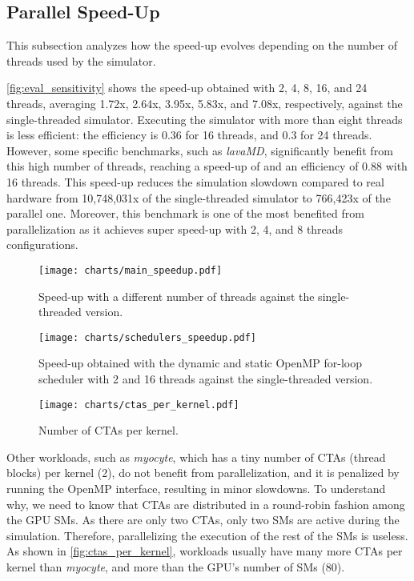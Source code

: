 \subsection{Parallel Speed-Up}

\par
This subsection analyzes how the speed-up evolves depending on the number of threads used by the simulator. 

\par
\autoref{fig:eval_sensitivity} shows the speed-up obtained with 2, 4, 8, 16, and 24 threads, averaging 1.72x, 2.64x, 3.95x, 5.83x, and 7.08x, respectively, against the single-threaded simulator. Executing the simulator with more than eight threads is less efficient: the efficiency is 0.36 for 16 threads, and 0.3 for 24 threads. However, some specific benchmarks, such as \textit{lavaMD}, significantly benefit from this high number of threads, reaching a speed-up of \summaryMaxSpeedup{} and an efficiency of 0.88 with 16 threads. This speed-up reduces the simulation slowdown compared to real hardware from 10,748,031x of the single-threaded simulator to 766,423x of the parallel one. Moreover, this benchmark is one of the most benefited from parallelization as it achieves super speed-up with 2, 4, and 8 threads configurations.


\begin{figure*}[ht]
  \centering
  \texttt{[image: charts/main\_speedup.pdf]}
  \caption{Speed-up with a different number of threads against the single-threaded version.}
  \label{fig:eval_sensitivity}
\end{figure*}

\begin{figure*}[ht]
  \centering
  \texttt{[image: charts/schedulers\_speedup.pdf]}
  \caption{Speed-up obtained with the dynamic and static OpenMP for-loop scheduler with 2 and 16 threads against the single-threaded version.}
  \label{fig:eval_openmp_scheduler}
\end{figure*}

\begin{figure}[ht]
  \centering
  \texttt{[image: charts/ctas\_per\_kernel.pdf]}
  \caption{Number of CTAs per kernel.}
  \label{fig:ctas_per_kernel}
\end{figure}

\par
Other workloads, such as \textit{myocyte}, which has a tiny number of CTAs (thread blocks) per kernel (2), do not benefit from parallelization, and it is penalized by running the OpenMP interface, resulting in minor slowdowns. To understand why, we need to know that CTAs are distributed in a round-robin fashion among the GPU SMs. As there are only two CTAs, only two SMs are active during the simulation. Therefore, parallelizing the execution of the rest of the SMs is useless. As shown in \autoref{fig:ctas_per_kernel}, workloads usually have many more CTAs per kernel than \textit{myocyte}, and more than the GPU's number of SMs (80).

